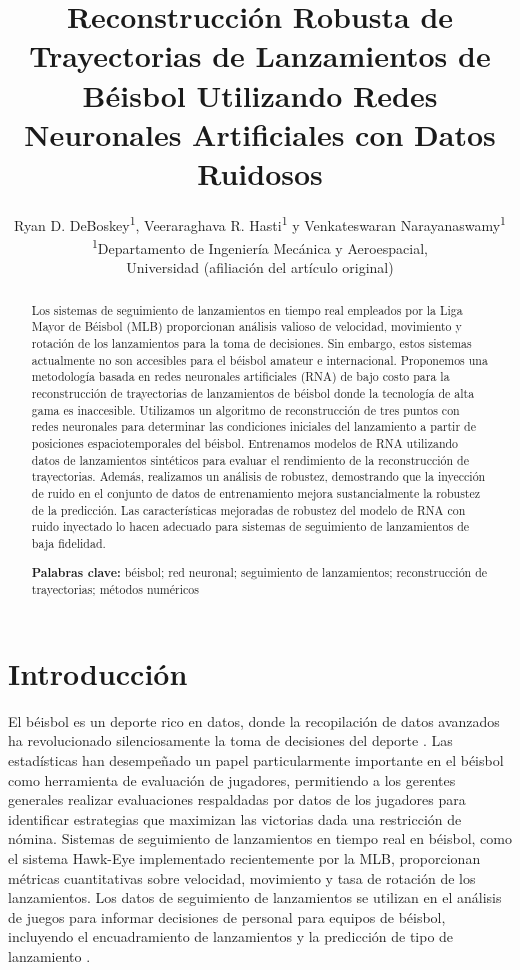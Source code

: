 \documentclass[12pt,a4paper]{article}
\title{\textbf{Reconstrucción Robusta de Trayectorias de Lanzamientos de Béisbol Utilizando Redes Neuronales Artificiales con Datos Ruidosos}}
\author{
Ryan D. DeBoskey\textsuperscript{1}, Veeraraghava R. Hasti\textsuperscript{1} y Venkateswaran Narayanaswamy\textsuperscript{1}\\[0.5cm]
\textsuperscript{1}Departamento de Ingeniería Mecánica y Aeroespacial,\\
Universidad (afiliación del artículo original)
}
\date{}
\begin{document}
\maketitle

\begin{abstract}
\noindent Los sistemas de seguimiento de lanzamientos en tiempo real empleados por la Liga Mayor de Béisbol (MLB) proporcionan análisis valioso de velocidad, movimiento y rotación de los lanzamientos para la toma de decisiones. Sin embargo, estos sistemas actualmente no son accesibles para el béisbol amateur e internacional. Proponemos una metodología basada en redes neuronales artificiales (RNA) de bajo costo para la reconstrucción de trayectorias de lanzamientos de béisbol donde la tecnología de alta gama es inaccesible. Utilizamos un algoritmo de reconstrucción de tres puntos con redes neuronales para determinar las condiciones iniciales del lanzamiento a partir de posiciones espaciotemporales del béisbol. Entrenamos modelos de RNA utilizando datos de lanzamientos sintéticos para evaluar el rendimiento de la reconstrucción de trayectorias. Además, realizamos un análisis de robustez, demostrando que la inyección de ruido en el conjunto de datos de entrenamiento mejora sustancialmente la robustez de la predicción. Las características mejoradas de robustez del modelo de RNA con ruido inyectado lo hacen adecuado para sistemas de seguimiento de lanzamientos de baja fidelidad.

\vspace{0.5cm}
\noindent\textbf{Palabras clave:} béisbol; red neuronal; seguimiento de lanzamientos; reconstrucción de trayectorias; métodos numéricos

\end{abstract}

\section{Introducción}

El béisbol es un deporte rico en datos, donde la recopilación de datos avanzados ha revolucionado silenciosamente la toma de decisiones del deporte \citep{hintz2022}. Las estadísticas han desempeñado un papel particularmente importante en el béisbol como herramienta de evaluación de jugadores, permitiendo a los gerentes generales realizar evaluaciones respaldadas por datos de los jugadores para identificar estrategias que maximizan las victorias dada una restricción de nómina. Sistemas de seguimiento de lanzamientos en tiempo real en béisbol, como el sistema Hawk-Eye implementado recientemente por la MLB, proporcionan métricas cuantitativas sobre velocidad, movimiento y tasa de rotación de los lanzamientos. Los datos de seguimiento de lanzamientos se utilizan en el análisis de juegos para informar decisiones de personal para equipos de béisbol, incluyendo el encuadramiento de lanzamientos \citep{deshpande2017} y la predicción de tipo de lanzamiento \citep{umemura2021}.
\end{document}
